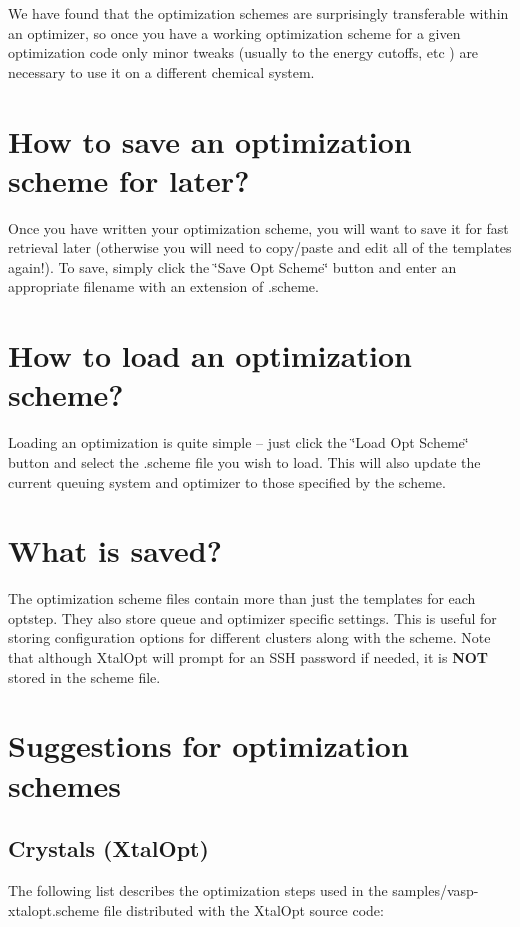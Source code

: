 We have found that the optimization schemes are surprisingly transferable within an optimizer, so once you have a working optimization scheme for a given optimization code only minor tweaks (usually to the energy cutoffs, etc ) are necessary to use it on a different chemical system.\hypertarget{optschemes_saving}{}\section{How to save an optimization scheme for later?}\label{optschemes_saving}
Once you have written your optimization scheme, you will want to save it for fast retrieval later (otherwise you will need to copy/paste and edit all of the templates again!). To save, simply click the \char`\"{}\+Save Opt
\+Scheme\char`\"{} button and enter an appropriate filename with an extension of .scheme.\hypertarget{optschemes_loading}{}\section{How to load an optimization scheme?}\label{optschemes_loading}
Loading an optimization is quite simple -- just click the \char`\"{}\+Load Opt
\+Scheme\char`\"{} button and select the .scheme file you wish to load. This will also update the current queuing system and optimizer to those specified by the scheme.\hypertarget{optschemes_format}{}\section{What is saved?}\label{optschemes_format}
The optimization scheme files contain more than just the templates for each optstep. They also store queue and optimizer specific settings. This is useful for storing configuration options for different clusters along with the scheme. Note that although Xtal\+Opt will prompt for an S\+S\+H password if needed, it is {\bfseries N\+O\+T} stored in the scheme file.\hypertarget{optschemes_suggest}{}\section{Suggestions for optimization schemes}\label{optschemes_suggest}
\hypertarget{optschemes_sug-xtal}{}\subsection{Crystals (\+Xtal\+Opt)}\label{optschemes_sug-xtal}
The following list describes the optimization steps used in the samples/vasp-\/xtalopt.\+scheme file distributed with the Xtal\+Opt source code\+:
